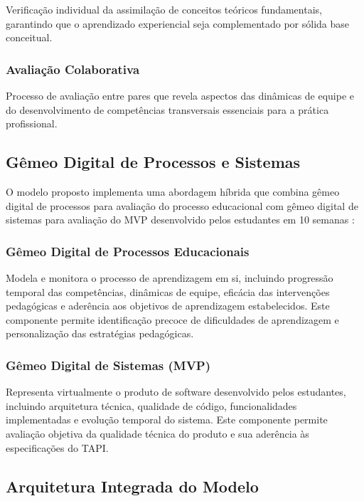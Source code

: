\documentclass[12pt,a4paper]{article}
\renewcommand{\cite}[1]{}
\begin{document}
Verificação individual da assimilação de conceitos teóricos fundamentais,
garantindo que o aprendizado experiencial seja complementado por sólida base
conceitual.

\subsubsection{Avaliação Colaborativa}

Processo de avaliação entre pares que revela aspectos das dinâmicas de equipe e
do desenvolvimento de competências transversais essenciais para a prática
profissional.

\subsection{Gêmeo Digital de Processos e Sistemas}

O modelo proposto implementa uma abordagem híbrida que combina gêmeo digital de
processos para avaliação do processo educacional com gêmeo digital de sistemas
para avaliação do MVP desenvolvido pelos estudantes em 10 semanas
\cite{barricelli2019}:

\subsubsection{Gêmeo Digital de Processos Educacionais}

Modela e monitora o processo de aprendizagem em si, incluindo progressão
temporal das competências, dinâmicas de equipe, eficácia das intervenções
pedagógicas e aderência aos objetivos de aprendizagem estabelecidos. Este
componente permite identificação precoce de dificuldades de aprendizagem e
personalização das estratégias pedagógicas.

\subsubsection{Gêmeo Digital de Sistemas (MVP)}

Representa virtualmente o produto de software desenvolvido pelos estudantes,
incluindo arquitetura técnica, qualidade de código, funcionalidades
implementadas e evolução temporal do sistema. Este componente permite avaliação
objetiva da qualidade técnica do produto e sua aderência às especificações do
TAPI.

\subsection{Arquitetura Integrada do Modelo}
\end{document}
